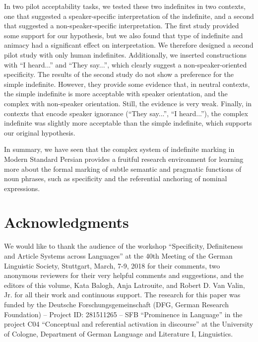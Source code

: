 \documentclass[output=paper]{langsci/langscibook}
\begin{document}
{
In two pilot acceptability tasks, we tested these two indefinites in two contexts, one that suggested a speaker-specific interpretation of the indefinite, and a second that suggested a non-speaker-specific interpretation. The first study provided some support for our hypothesis, but we also found that type of indefinite and animacy had a significant effect on interpretation. We therefore designed a second pilot study with only human indefinites. Additionally, we inserted constructions with ``I heard...'' and ``They say...'', which clearly suggest a non-speaker-oriented specificity. The results of the second study do not show a preference for the simple indefinite. However, they provide some evidence that, in neutral contexts, the simple indefinite is more acceptable with speaker orientation, and the complex with non-speaker orientation. Still, the evidence is very weak. Finally, in contexts that encode speaker ignorance (``They say...'', ``I heard...''), the complex indefinite was slightly more acceptable than the simple indefinite, which supports our original hypothesis.
}

{
In summary, we have seen that the complex system of indefinite marking in Modern Standard Persian provides a fruitful research environment for learning more about the formal marking of subtle semantic and pragmatic functions of noun phrases, such as specificity and the referential anchoring of nominal expressions.
}


\section*{Acknowledgments}
We would like to thank the audience of the workshop ``Specificity, Definiteness and Article Systems across Languages'' at the 40th Meeting of the German Linguistic Society, Stuttgart, March, 7-9, 2018 for their comments, two anonymous reviewers for their very helpful comments and suggestions, and the editors of this volume, Kata Balogh, Anja Latrouite, and Robert D. Van Valin, Jr. for all their work and continuous support. The research for this paper was funded by the Deutsche Forschungsgemeinschaft (DFG, German Research Foundation) -- Project ID: 281511265 -- SFB ``Prominence in Language'' in the project C04 ``Conceptual and referential activation in discourse'' at the University of Cologne, Department of German Language and Literature I, Linguistics.

{\sloppy\printbibliography[heading=subbibliography,notkeyword=this]}
\end{document}
